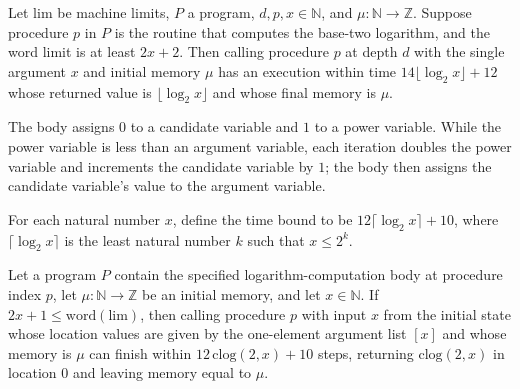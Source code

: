 \begin{theorem}
\label{Light.log2_meets}
\leanok
{}
Let $\mathrm{lim}$ be machine limits, $P$ a program, $d,p,x\in\mathbb N$, and
$\mu:\mathbb N\to\mathbb Z$. Suppose procedure $p$ in $P$ is the routine that computes
the base-two logarithm, and the word limit is at least $2x+2$. Then calling procedure
$p$ at depth $d$ with the single argument $x$ and initial memory $\mu$ has an execution
within time $14\lfloor\log_2 x\rfloor+12$ whose returned value is $\lfloor\log_2
x\rfloor$ and whose final memory is $\mu$.
\end{theorem}

\begin{definition}
\label{Light.clog2Body}
\leanok
{}
The body assigns $0$ to a candidate variable and $1$ to a power variable. While the
power variable is less than an argument variable, each iteration doubles the power
variable and increments the candidate variable by $1$; the body then assigns the
candidate variable’s value to the argument variable.
\end{definition}

\begin{definition}
\label{Light.clog2Time}
\leanok
For each natural number $x$, define the time bound to be $12\lceil\log_2 x\rceil+10$,
where $\lceil\log_2 x\rceil$ is the least natural number $k$ such that $x\le 2^k$.
\end{definition}

\begin{theorem}
\label{Light.clog2_meets}
\leanok
{}
Let a program $P$ contain the specified logarithm-computation body at procedure index
$p$, let $\mu:\mathbb{N}\to\mathbb{Z}$ be an initial memory, and let $x\in\mathbb{N}$.
If $2x+1\leq\mathrm{word}(\mathrm{lim})$, then calling procedure $p$ with input $x$ from
the initial state whose location values are given by the one-element argument list $[x]$
and whose memory is $\mu$ can finish within $12\,\mathrm{clog}(2,x)+10$ steps, returning
$\mathrm{clog}(2,x)$ in location $0$ and leaving memory equal to $\mu$.
\end{theorem}

